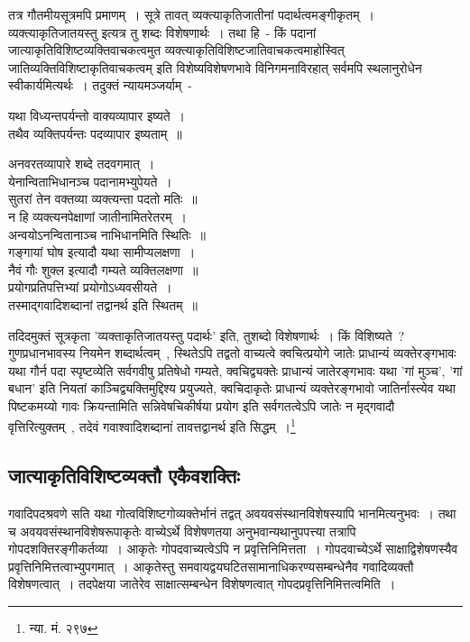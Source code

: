 		तत्र गौतमीयसूत्रमपि प्रमाणम्~। सूत्रे तावत् व्यक्त्याकृतिजातीनां पदार्थत्वमङ्गीकृतम्~। व्यक्त्याकृतिजातयस्तु इत्यत्र तु शब्दः विशेषणार्थः~। तथा हि~- किं पदानां जात्याकृतिविशिष्टव्यक्तिवाचकत्वमुत व्यक्त्याकृतिविशिष्टजातिवाचकत्वमाहोस्वित् जातिव्यक्तिविशिष्टाकृतिवाचकत्वम् इति विशेष्यविशेषणभावे विनिगमनाविरहात् सर्वमपि स्थलानुरोधेन स्वीकार्यमित्यर्थः~। तदुक्तं न्यायमञ्जर्याम्~-

		{\fontsize{11.7}{0}\selectfont\s \begin{center}यथा विध्यन्तपर्यन्तो वाक्यव्यापार इष्यते~।\\ तथैव व्यक्तिपर्यन्तः पदव्यापार इष्यताम्~॥\end{center}}

		{\fontsize{11.7}{0}\selectfont\s \begin{center}अनवरतव्यापारे शब्दे तदवगमात्~।\\ येनान्विताभिधानञ्च पदानामभ्युपेयते~।\\ सुतरां तेन वक्तव्या व्यक्त्यन्ता पदतो मतिः~॥\\ न हि व्यक्त्यनपेक्षाणां जातीनामितरेतरम्~।\\ अन्वयोऽनन्वितानाञ्च नाभिधानमिति स्थितिः~॥\\ गङ्गायां घोष इत्यादौ यथा सामीप्यलक्षणा~।\\ नैवं गौः शुक्ल इत्यादौ गम्यते व्यक्तिलक्षणा~॥\\ प्रयोगप्रतिपत्तिभ्यां प्रयोगोऽध्यवसीयते~।\\ तस्माद्गवादिशब्दानां तद्वानर्थ इति स्थितम्~॥\end{center}}

		{\fontsize{11.7}{0}\selectfont\s तदिदमुक्तं सूत्रकृता 'व्यक्ताकृतिजातयस्तु पदार्थः' इति, तुशब्दो विशेषणार्थः~। किं विशिष्यते~? गुणप्रधानभावस्य नियमेन शब्दार्थत्वम्~, स्थितेऽपि तद्वतो वाच्यत्वे क्वचित्प्रयोगे जातेः प्राधान्यं व्यक्तेरङ्गभावः यथा गौर्न पदा स्पृष्टव्येति सर्वगवीषु प्रतिषेधो गम्यते, क्वचिद्व्यक्तेः प्राधान्यं जातेरङ्गभावः यथा 'गां मुञ्च', 'गां बधान' इति नियतां काञ्चिद्व्यक्तिमुद्दिश्य प्रयुज्यते, क्वचिदाकृतेः प्राधान्यं व्यक्तेरङ्गभावो जातिर्नास्त्येव यथा पिष्टकमय्यो गावः क्रियन्तामिति सन्निवेषचिकीर्षया प्रयोग इति सर्वगतत्वेऽपि जातेः न मृद्गवादौ वृत्तिरित्युक्तम्~, तदेवं गवाश्वादिशब्दानां तावत्तद्वानर्थ इति सिद्धम्~।\footnote{न्या. मं. २९७}}


		\subsection{जात्याकृतिविशिष्टव्यक्तौ एकैवशक्तिः}

		गवादिपदश्रवणे सति यथा गोत्वविशिष्टगोव्यक्तेर्भानं तद्वत् अवयवसंस्थानविशेषस्यापि भानमित्यनुभवः~। तथा च अवयवसंस्थानविशेषरूपाकृतेः वाच्येऽर्थे विशेषणतया अनुभवान्यथानुपपत्त्या तत्रापि गोपदशक्तिरङ्गीकर्तव्या~। आकृतेः गोपदवाच्यत्वेऽपि न प्रवृत्तिनिमित्तता~। गोपदवाच्येऽर्थे साक्षाद्विशेषणस्यैव प्रवृत्तिनिमित्तत्वाभ्युपगमात्~। आकृतेस्तु समवायद्वयघटितसामानाधिकरण्यसम्बन्धेनैव गवादिव्यक्तौ विशेषणत्वात्~। तदपेक्षया जातेरेव साक्षात्सम्बन्धेन विशेषणत्वात् गोपदप्रवृत्तिनिमित्तत्वमिति~।

